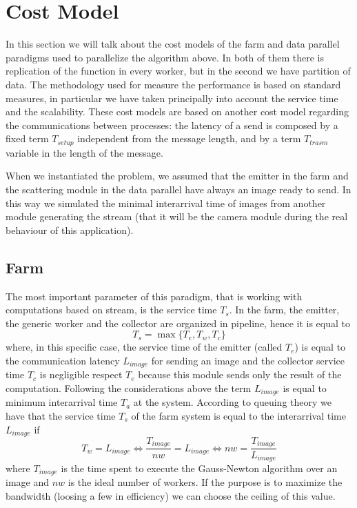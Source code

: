 \section{Cost Model}

In this section we will talk about the cost models of the farm and data parallel paradigms used to parallelize the algorithm above. In both of them there is replication of the function in every worker, but in the second we have partition of data. The methodology used for measure the performance is based on standard measures, in particular we have taken principally into account the service time and the scalability. These cost models are based on another cost model regarding the communications between processes: the latency of a send is composed by a fixed term $T_{setup}$ independent from the message length, and by a term $T_{trasm}$ variable in the length of the message.

When we instantiated the problem, we assumed that the emitter in the farm and the scattering module in the data parallel have always an image ready to send. In this way we simulated the minimal interarrival time of images from another module generating the stream (that it will be the camera module during the real behaviour of this application).

\subsection{Farm}

The most important parameter of this paradigm, that is working with computations based on stream, is the service time $T_{s}$. In the farm, the emitter, the generic worker and the collector are organized in pipeline, hence it is equal to
\[
T_{s} = \max \lbrace T_{e}, T_{w}, T_{c}\rbrace
\]
where, in this specific case, the service time of the emitter (called $T_{e}$) is equal to the communication latency $L_{image}$ for sending an image and the collector service time $T_{c}$ is negligible respect $T_{e}$ because this module sends only the result of the computation. Following the considerations above the term $L_{image}$ is equal to minimum interarrival time $T_{a}$ at the system. According to queuing theory we have that the service time $T_{s}$ of the farm system is equal to the interarrival time $L_{image}$ if
\[
T_{w} = L_{image} \Leftrightarrow \frac{T_{image}}{nw} = L_{image} \Leftrightarrow nw = \frac{T_{image}}{L_{image}} 
\]
where $T_{image}$ is the time spent to execute the Gauss-Newton algorithm over an image and $nw$ is the ideal number of workers. If the purpose is to maximize the bandwidth (loosing a few in efficiency) we can choose the ceiling of this value.

